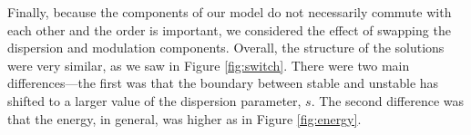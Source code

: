 Finally, because the components of our model do not necessarily commute with each other and the order is important, we considered the effect of swapping the dispersion and modulation components. Overall, the structure of the solutions were very similar, as we saw in Figure \ref{fig:switch}. There were two main differences---the first was that the boundary between stable and unstable has shifted to a larger value of the dispersion parameter, $s$. The second difference was that the energy, in general, was higher as in Figure \ref{fig:energy}. \\
